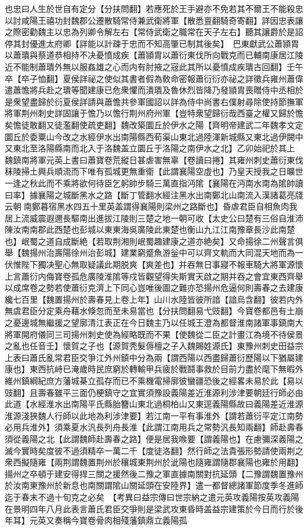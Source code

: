 也忠曰人生於世自有定分【分扶問翻】若應死於王手避亦不免若其不爾王不能殺忠以討咸陽王禧功封魏郡公遷散騎常侍兼武衛將軍【散悉亶翻騎奇寄翻】詳因忠表讓之際密勸魏主以忠為列卿令解左右【常侍武衛之職常在天子左右】聽其讓爵於是詔停其封優進太府卿【詳能以計疎于忠而不知高肇已制其後矣】　巴東獻武公蕭頴胄以蕭璝與蔡道恭相持不决憂憤成疾【蕭頴胄以蕭衍東伐所向戰克而已輔南康居江陵近不能制蕭璝外無以服姦雄之心而内有肘掖之宼此其所以憂憤成疾璝古回翻】壬午卒【卒子恤翻】夏侯詳祕之使似其書者假為敎命密報蕭衍衍亦祕之詳徵兵雍州蕭偉遣蕭憺將兵赴之璝等聞建康已危衆懼而潰璝及魯休烈皆降乃發頴胄喪贈侍中丞相於是衆望盡歸於衍夏侯詳請與蕭憺共參軍國詔以詳為侍中尚書右僕射尋除使持節撫軍將軍荆州刺史詳固讓于憺乃以憺行荆州府州軍【豈特衆望歸衍哉西臺之權又歸於憺矣憺徒敢翻又徒濫翻使疏吏翻】魏改築圜丘於伊水之陽【齊明帝建武二年魏孝文定圜丘於委粟山今改之水經伊水出南陽縣西荀渠山東北過陸渾新城縣又東北過伊闕中又東北至洛陽縣南而北入于洛魏盖立圜丘于洛陽之南伊水之北】乙卯始祀於其上　魏鎮南將軍元英上書曰蕭寶卷荒縱日甚虐害無辜【卷讀曰捲】其雍州刺史蕭衍東伐秣陵掃土興兵順流而下唯有孤城更無重衛【此謂襄陽空虛也】乃皇天授我之日曠世一逢之秋此而不乘將欲何待臣乞躬帥步騎三萬直指沔隂【襄陽在沔南水南為隂帥讀曰率】據襄陽之城斷黑水之路【斷丁管翻水經注黑水出南鄭北山南流入漢諸葛亮牋云朝南鄭暮宿黑水四五十里英盖謂得襄陽則梁州之路斷也】昏虐君臣自相魚肉我居上流威震遐邇長驅南出進拔江陵則三楚之地一朝可收【太史公曰楚有三俗自淮沛陳汝南南郡此西楚也彭城以東東海吳廣陵此東楚也衡山九江江南豫章長沙此南楚也】岷蜀之道自成斷絶【若取荆湘則岷蜀趣建康之道亦絶矣】又命揚徐二州聲言俱舉【魏揚州治壽陽徐州治彭城】建業窮蹙魚游釡中可以齊文軌而大同混天地而為一伏惟陛下獨决聖心無取疑議此期脱爽【爽差也】并吞無日事寢不報車騎大將軍源懷上言蕭衍内侮寶卷孤危廣陵淮隂等戍皆觀望得失斯實天啟之期并吞之會宜東西齊舉以成席卷之勢若使蕭衍克濟上下同心豈唯後圖之難亦恐揚州危逼何則壽春之去建康纔七百里【魏置揚州於壽春見上卷上年】山川水陸皆彼所諳【諳烏含翻】彼若内外無虞君臣分定乘舟藉水倏忽而至未易當也【分扶問翻易弋豉翻】今寶卷都邑有土崩之憂邊城無繼援之望廓清江表正在今日魏主乃以任城王澄為都督淮南諸軍事鎮南大將軍開府儀同三司揚州刺史使為經略既而不果【使魏從二臣之計畫江為境不待侯景之亂也任音壬】懷賀之子也【源賀秃髮傉檀之子入魏賜姓源氏】東豫州刺史田益宗上表曰蕭氏亂常君臣交爭江外州鎮中分為兩【謂西陽以西盡歸蕭衍歷陽以下猶屬建康也】東西抗峙已淹歲時民庶窮於轉輸甲兵疲於戰鬪事救於目前力盡於麾下無暇外維州鎮綱紀庶方藩城棊立孤存而已不乘機電掃廓彼蠻疆恐後之經畧未易於此【易以豉翻】且壽春雖平三面仍梗鎮守之宜實須豫設義陽差近淮源利涉津要朝廷行師必由此道【水經淮水出南陽平氏縣胎簪山東北過桐柏山又東逕義陽縣故曰義陽差近淮源淮源淺狹魏人行師以此地為利涉津要】若江南一平有事淮外【謂若蕭衍平定江南勢必用兵淮外】須乘夏水汎長列舟長淮【此謂江南用兵之常勢汎長知兩翻】師赴壽春須從義陽之北【此謂魏師赴壽春之路】便是居我㗋要【謂義陽也】在慮彌深義陽之滅今實時矣度彼不過須精卒一萬二千【度徒洛翻】然行師之法貴張形勢請使兩荆之衆西擬隨雍【兩荆謂魏置荆州於穰城東荆州於泚陽也隨雍謂隨郡襄陽也雍於用翻】揚州之卒頓于建安得捍三關之援然後二豫之軍直據南關對抗延頭【二豫謂魏置豫州於汝南東豫州於新息也南關謂隂山關延頭在安陸界】遣一都督總諸軍節度季冬進師迄于春末不過十旬克之必矣　【考異曰益宗傳曰世宗納之遣元英攻義陽按英攻義陽在景明四年八月此表言蕭氏君臣交爭則是梁武攻東昏時盖益宗建策於今日而行於後年耳】元英又奏稱今寶卷骨肉相殘藩鎮鼎立義陽孤